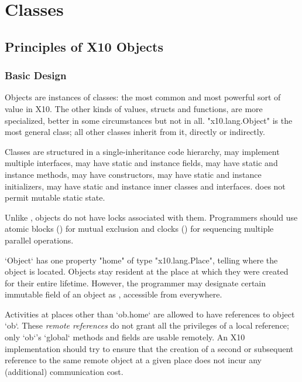 \chapter{Classes}
\label{XtenClasses}

\section{Principles of X10 Objects}\label{XtenObjects}

\subsection{Basic Design}

Objects are instances of classes: the most common and most powerful sort of
value in X10.  The other kinds of values, structs and functions, are more
specialized, better in some circumstances but not in all.
\xcd"x10.lang.Object" is the most general class; all other classes inherit
from it, directly or indirectly. 


Classes are structured in a single-inheritance code
hierarchy, may implement multiple interfaces, may have static and
instance fields, may have static and instance methods, may have
constructors, may have static and instance initializers, may have
static and instance inner classes and interfaces. \Xten{} does not
permit mutable static state.

Unlike \java{}, {}\Xten{} objects do not have locks associated with them.
Programmers should use atomic blocks () for mutual
exclusion and clocks () for sequencing multiple parallel
operations.

\xcd`Object` has one property \xcd"home" of type
\xcd"x10.lang.Place", telling where the object is located.
Objects stay resident at the place at which they were created for their entire
lifetime. However, the programmer may designate certain immutable field of an
object as , accessible from everywhere.


Activities at places other than \xcd`ob.home` are allowed to have references
to object \xcd`ob`.   These {\em remote references} do not grant all the
privileges of a local reference; only \xcd`ob`'s \xcd`global` methods and
fields are usable remotely. An X10
implementation should try to ensure that the creation of a second or
subsequent reference to the same remote object at a given place does
not incur any (additional) communication cost.

